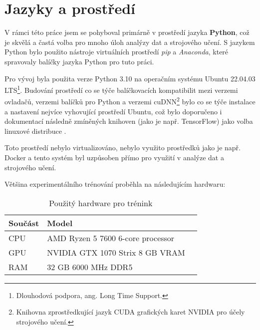 \section{Jazyky a prostředí}
\label{sec:Chapter51}
V rámci této práce jsem se pohyboval primárně v prostředí jazyka \textbf{Python}, což je skvělá a častá volba pro mnoho úloh analýzy dat a strojového učení. S jazykem Python bylo použito nástroje virtuálních prostředí \textit{pip} a \textit{Anaconda}, které spravovaly balíčky jazyka Python pro tuto práci.

Pro vývoj byla použita verze Python 3.10 na operačním systému Ubuntu 22.04.03 LTS\footnote{Dlouhodová podpora, ang. Long Time Support.}. Budování prostředí co se týče balíčkovacích kompatibilit mezi verzemi ovladačů, verzemi balíčků pro Python a verzemi cuDNN\footnote{Knihovna zprostředkující jazyk CUDA grafických karet NVIDIA pro účely strojového učení.} bylo co se týče instalace a nastavení nejvíce vyhovující prostředí Ubuntu, což bylo doporučeno i dokumentací následně zmíněných knihoven (jako je např. TensorFlow) jako volba linuxové distribuce \cite{tensorflow_install}.

Toto prostředí nebylo virtualizováno, nebylo využito prostředků jako je např. Docker a tento systém byl uzpůsoben přímo pro využití v analýze dat a strojového učení.

Většina experimentálního trénování proběhla na následujícím hardwaru:

\begin{table}[ht]
\centering
\begin{tabular}{@{}lll@{}}
\toprule
Součást & Model \\
\midrule
CPU & AMD Ryzen 5 7600 6-core processor \\
GPU & NVIDIA GTX 1070 Strix 8 GB VRAM  \\
RAM & 32 GB 6000 MHz DDR5 \\
\bottomrule
\end{tabular}
\caption{Použitý hardware pro trénink}
\label{fig:wortelus_pc}
\end{table}

